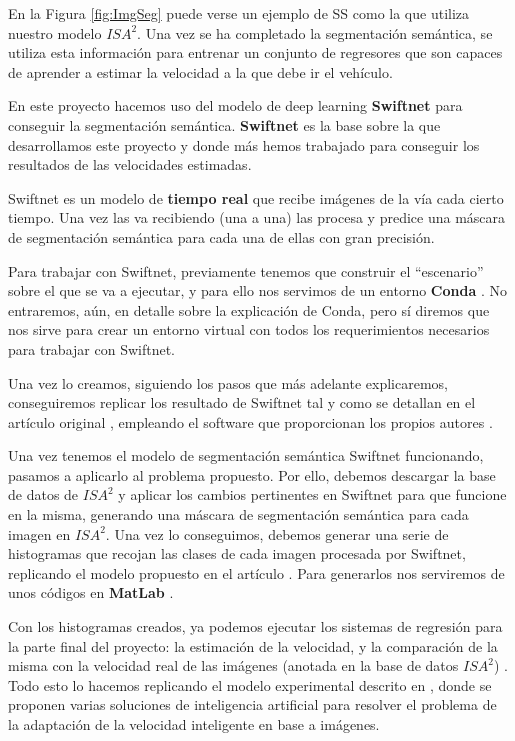 En la Figura \ref{fig:ImgSeg} puede verse un ejemplo de \ac{SS} como la que utiliza nuestro modelo $ISA^{2}$. Una vez se ha completado la segmentación semántica, se utiliza esta información para entrenar un conjunto de regresores que son capaces de aprender a estimar la velocidad a la que debe ir el vehículo.

En este proyecto hacemos uso del modelo de deep learning \textbf{Swiftnet} \cite{swiftnet} para conseguir la segmentación semántica. \textbf{Swiftnet} es la base sobre la que desarrollamos este proyecto y donde más hemos trabajado para conseguir los resultados de las velocidades estimadas.

Swiftnet es un modelo de \textbf{tiempo real} que recibe imágenes de la vía cada cierto tiempo. Una vez las va recibiendo (una a una) las procesa y predice una máscara de segmentación semántica para cada una de ellas con gran precisión.

Para trabajar con Swiftnet, previamente tenemos que construir el ``escenario'' sobre el que se va a ejecutar, y para ello nos servimos de un entorno \textbf{Conda} \cite{conda}. No entraremos, aún, en detalle sobre la explicación de Conda, pero sí diremos que nos sirve para crear un entorno virtual con todos los requerimientos necesarios para trabajar con Swiftnet.

Una vez lo creamos, siguiendo los pasos que más adelante explicaremos, conseguiremos replicar los resultado de Swiftnet tal y como se detallan en el artículo original \cite{swiftnet}, empleando el software que proporcionan los propios autores \cite{github_swiftnet}.


Una vez tenemos el modelo de segmentación semántica Swiftnet funcionando, pasamos a aplicarlo al problema propuesto. Por ello, debemos descargar la base de datos de $ISA^{2}$ y aplicar los cambios pertinentes en Swiftnet para que funcione en la misma, generando una máscara de segmentación semántica para cada imagen en $ISA^{2}$. Una vez lo conseguimos, debemos generar una serie de histogramas \cite{histograma} que recojan las clases de cada imagen procesada por Swiftnet, replicando el modelo propuesto en el artículo \cite{isa2}. Para generarlos nos serviremos de unos códigos en \textbf{MatLab} \cite{matlab}.

Con los histogramas creados, ya podemos ejecutar los sistemas de regresión para la parte final del proyecto: la estimación de la velocidad, y la comparación de la misma con la velocidad real de las imágenes (anotada en la base de datos $ISA^{2}$) . Todo esto lo hacemos replicando el modelo experimental descrito en \cite{isa2}, donde se proponen varias soluciones de inteligencia artificial para resolver el problema de la adaptación de la velocidad inteligente en base a imágenes.

